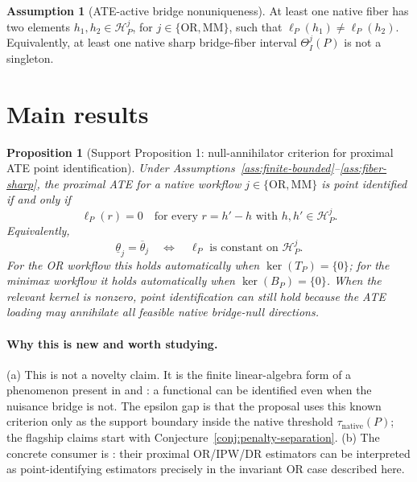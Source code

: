 \documentclass[11pt]{article}
\newcommand{\calH}{\mathcal{H}}
\theoremstyle{definition}
\newtheorem{assumption}{Assumption}
\theoremstyle{plain}
\newtheorem{proposition}{Proposition}
\theoremstyle{remark}
\begin{document}
\begin{assumption}[ATE-active bridge nonuniqueness]\label{ass:active-nonunique}
At least one native fiber has two elements \(h_1,h_2\in\calH_P^j\), for
\(j\in\{\mathrm{OR},\mathrm{MM}\}\), such that
\(\ell_P(h_1)\neq\ell_P(h_2)\).  Equivalently, at least one native sharp
bridge-fiber interval \(\Theta_I^j(P)\) is not a singleton.
\end{assumption}

\section{Main results}
\begin{proposition}[Support Proposition 1: null-annihilator criterion for proximal ATE point identification]\label{prop:null-annihilator}
Under Assumptions~\ref{ass:finite-bounded}--\ref{ass:fiber-sharp},
the proximal ATE for a native workflow \(j\in\{\mathrm{OR},\mathrm{MM}\}\)
is point identified if and only if
\[
\ell_P(r)=0
\quad\text{for every }r=h'-h\text{ with }h,h'\in\calH_P^j.
\]
Equivalently,
\[
\underline\theta_j=\overline\theta_j
\quad\Longleftrightarrow\quad
\ell_P \text{ is constant on } \calH_P^j.
\]
For the OR workflow this holds automatically when
\(\operatorname{ker}(T_P)=\{0\}\); for the minimax workflow it holds
automatically when \(\operatorname{ker}(B_P)=\{0\}\).  When the relevant
kernel is nonzero, point identification can still hold because the ATE
loading may annihilate all feasible native bridge-null directions.
\end{proposition}
\paragraph{Why this is new and worth studying.}
(a) This is not a novelty claim.  It is the finite linear-algebra form of a
phenomenon present in
\citet{ZhangLiMiaoTchetgen2023SPL} and
\citet{BennettKallusMaoNeweySyrgkanisUehara2023COLT}: a functional can be
identified even when the nuisance bridge is not.  The epsilon gap is that
the proposal uses this known criterion only as the support boundary inside
the native threshold \(\tau_{\mathrm{native}}(P)\); the flagship claims start
with Conjecture~\ref{conj:penalty-separation}.  (b) The concrete consumer is
\citet{CuiPuShiMiaoTchetgen2024JASA}: their proximal OR/IPW/DR estimators
can be interpreted as point-identifying estimators precisely in the invariant
OR case described here.
\end{document}
